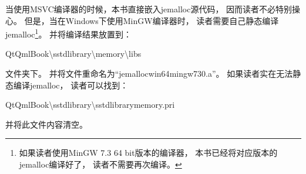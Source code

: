 当使用MSVC编译器的时候，本书直接嵌入jemalloc源代码，
因而读者不必特别操心。
但是，当在Windows下使用MinGW编译器时，
读者需要自己静态编译jemalloc\footnote{
如果读者使用MinGW 7.3 64 bit版本的编译器，
本书已经将对应版本的jemalloc编译好了，
读者不需要再次编译。
}。
并将编译结果放置到：
\begin{littlelongworld}
QtQmlBook\textbackslash{}sstd\underline{\hspace{0.5em}}library\textbackslash{}memory\textbackslash{}libs
\end{littlelongworld}
文件夹下。
并将文件重命名为“jemalloc\underline{\hspace{0.5em}}win64\underline{\hspace{0.5em}}mingw\underline{\hspace{0.5em}}730.a”。
如果读者实在无法静态编译jemalloc，
读者可以找到：
\begin{littlelongworld}
QtQmlBook\textbackslash{}sstd\underline{\hspace{0.5em}}library\textbackslash{}\underline{\hspace{0.5em}}sstd\underline{\hspace{0.5em}}library\underline{\hspace{0.5em}}memory.pri
\end{littlelongworld}
并将此文件内容清空。





















